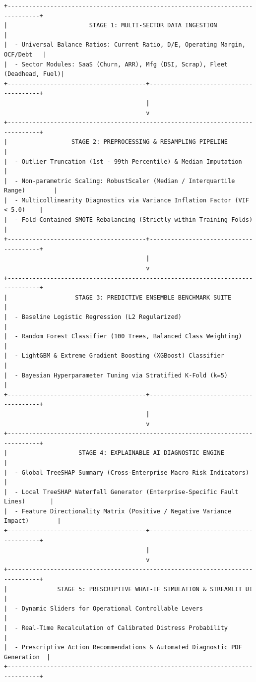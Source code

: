 \documentclass[11pt, a4paper]{article}
\begin{document}
\begin{verbatim}
+-------------------------------------------------------------------------------+
|                       STAGE 1: MULTI-SECTOR DATA INGESTION                    |
|  - Universal Balance Ratios: Current Ratio, D/E, Operating Margin, OCF/Debt   |
|  - Sector Modules: SaaS (Churn, ARR), Mfg (DSI, Scrap), Fleet (Deadhead, Fuel)|
+---------------------------------------+---------------------------------------+
                                        |
                                        v
+-------------------------------------------------------------------------------+
|                  STAGE 2: PREPROCESSING & RESAMPLING PIPELINE                 |
|  - Outlier Truncation (1st - 99th Percentile) & Median Imputation             |
|  - Non-parametric Scaling: RobustScaler (Median / Interquartile Range)        |
|  - Multicollinearity Diagnostics via Variance Inflation Factor (VIF < 5.0)    |
|  - Fold-Contained SMOTE Rebalancing (Strictly within Training Folds)          |
+---------------------------------------+---------------------------------------+
                                        |
                                        v
+-------------------------------------------------------------------------------+
|                   STAGE 3: PREDICTIVE ENSEMBLE BENCHMARK SUITE                |
|  - Baseline Logistic Regression (L2 Regularized)                              |
|  - Random Forest Classifier (100 Trees, Balanced Class Weighting)             |
|  - LightGBM & Extreme Gradient Boosting (XGBoost) Classifier                  |
|  - Bayesian Hyperparameter Tuning via Stratified K-Fold (k=5)                 |
+---------------------------------------+---------------------------------------+
                                        |
                                        v
+-------------------------------------------------------------------------------+
|                    STAGE 4: EXPLAINABLE AI DIAGNOSTIC ENGINE                  |
|  - Global TreeSHAP Summary (Cross-Enterprise Macro Risk Indicators)           |
|  - Local TreeSHAP Waterfall Generator (Enterprise-Specific Fault Lines)       |
|  - Feature Directionality Matrix (Positive / Negative Variance Impact)        |
+---------------------------------------+---------------------------------------+
                                        |
                                        v
+-------------------------------------------------------------------------------+
|              STAGE 5: PRESCRIPTIVE WHAT-IF SIMULATION & STREAMLIT UI          |
|  - Dynamic Sliders for Operational Controllable Levers                        |
|  - Real-Time Recalculation of Calibrated Distress Probability                 |
|  - Prescriptive Action Recommendations & Automated Diagnostic PDF Generation  |
+-------------------------------------------------------------------------------+
\end{verbatim}
\end{document}
